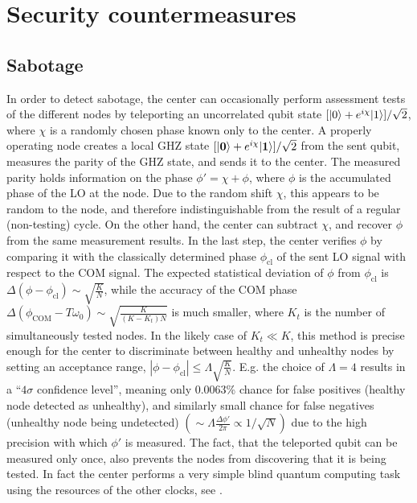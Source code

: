 




\section{Security countermeasures}

\subsection{Sabotage}
In order to detect sabotage, the center can occasionally perform assessment
tests of the different nodes by teleporting an uncorrelated qubit state $[| 0 \rangle +
e^{i\chi}| 1 \rangle]/\sqrt{2}$, where $\chi$ is a
 randomly chosen phase known only to the center.
A properly operating node creates a local GHZ state $[| \mathbf{0} \rangle +
e^{i\chi}| \mathbf{1} \rangle]/\sqrt{2}$ from the sent qubit,
 measures the parity of the GHZ state, and sends it to the center. The
measured parity holds information on the phase $\phi' = \chi + \phi$, where
$\phi$ is the accumulated phase of the LO at the node. Due to the random shift
$\chi$, this appears to be random to the node, and therefore indistinguishable
from the result of a regular (non-testing) cycle. On the other hand, the center
can subtract $\chi$, and recover $\phi$ from the same measurement results. In
the last step, the center verifies $\phi$ by comparing it with the classically
determined phase $\phi_\mathrm{cl}$ of the sent LO signal with respect to the COM
signal. The expected statistical deviation of
$\phi$ from $\phi_\mathrm{cl}$ is $\Delta(\phi -
\phi_\mathrm{cl})\sim\sqrt{\frac{K}{N}}$, while the accuracy of the COM phase
$\Delta(\phi_\mathrm{COM} - T\omega_0)\sim\sqrt{\frac{K}{(K-K_t)N}}$ is much
smaller, where $K_t$ is the number of simultaneously tested nodes. In the likely
case of $K_t \ll K$, this method is precise enough for the center to
discriminate between healthy and unhealthy nodes by setting an acceptance range,
$|\phi - \phi_\mathrm{cl}| \leq \Lambda \sqrt{\frac{K}{N}}$. E.g. the choice of
$\Lambda = 4$ results in a ``$4\sigma$ confidence level'', meaning only 0.0063\%
chance for false positives (healthy node detected as unhealthy), and similarly
small chance for false negatives (unhealthy node being undetected)
$(\sim\Lambda\frac{\Delta \phi'}{2\pi}\propto 1/\sqrt{N}) $ due to the high
precision with which $\phi'$ is measured.
The fact, that the teleported qubit can be measured only once, also prevents the
nodes from discovering that it is being tested. In fact the
center performs a very simple blind quantum computing task using the resources
of the other clocks, see \cite{Childs2001, Broadbent2009, Mantri2013}.

